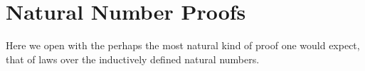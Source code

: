 \section{Natural Number Proofs}

Here we open with the perhaps the most natural kind of proof one would expect, that of laws over the inductively defined natural numbers.
